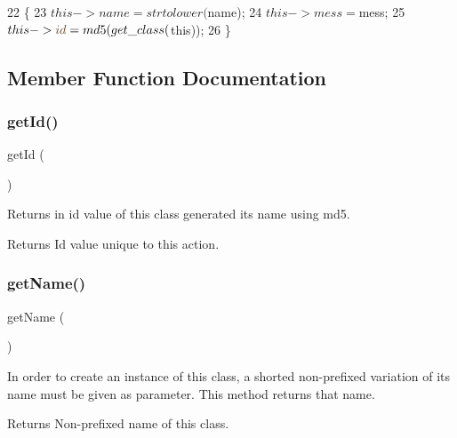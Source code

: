\begin{DoxyCode}
22                                                                 \{
23         $this->name             = strtolower ($name);
24         $this->mess             = $mess;
25         $this->\textcolor{keywordtype}{id}               = md5 (get\_class ($this));
26     \}
\end{DoxyCode}


\subsection{Member Function Documentation}
\mbox{\label{class_lora_1_1_base_action_a12251d0c022e9e21c137a105ff683f13}} 
\subsubsection{\texorpdfstring{get\+Id()}{getId()}}
{\footnotesize\ttfamily get\+Id (\begin{DoxyParamCaption}{ }\end{DoxyParamCaption})}

Returns in id value of this class generated its name using md5. \begin{DoxyReturn}{Returns}
Id value unique to this action. 
\end{DoxyReturn}

\mbox{\label{class_lora_1_1_base_action_a3d0963e68bb313b163a73f2803c64600}} 
\subsubsection{\texorpdfstring{get\+Name()}{getName()}}
{\footnotesize\ttfamily get\+Name (\begin{DoxyParamCaption}{ }\end{DoxyParamCaption})}

In order to create an instance of this class, a shorted non-\/prefixed variation of its name must be given as parameter. This method returns that name. \begin{DoxyReturn}{Returns}
Non-\/prefixed name of this class. 
\end{DoxyReturn}

